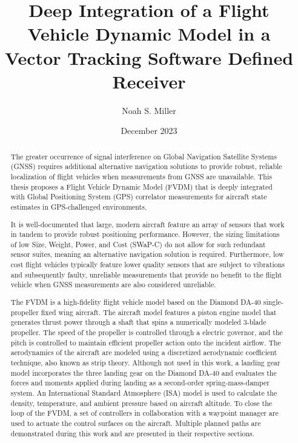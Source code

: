 \documentclass[12pt]{report}
\title{Deep Integration of a Flight Vehicle Dynamic Model in a Vector Tracking Software Defined Receiver}
\author{Noah S. Miller}
\date{December 2023}
\begin{document}
\begin{romanpages}      %

  \TitlePage{}
  \begin{abstract}
    The greater occurrence of signal interference on Global Navigation Satellite Systems (GNSS) requires additional alternative navigation solutions to provide robust, reliable localization of flight vehicles when measurements from GNSS are unavailable. This thesis proposes a Flight Vehicle Dynamic Model (FVDM) that is deeply integrated with Global Positioning System (GPS) correlator measurements for aircraft state estimates in GPS-challenged environments.

    It is well-documented that large, modern aircraft feature an array of sensors that work in tandem to provide robust positioning performance. However, the sizing limitations of low Size, Weight, Power, and Cost (SWaP-C) do not allow for such redundant sensor suites, meaning an alternative navigation solution is required. Furthermore, low cost flight vehicles typically feature lower quality sensors that are subject to vibrations and subsequently faulty, unreliable measurements that provide no benefit to the flight vehicle when GNSS measurements are also considered unreliable.

    The FVDM is a high-fidelity flight vehicle model based on the Diamond DA-40 single-propeller fixed wing aircraft. The aircraft model features a piston engine model that generates thrust power through a shaft that spins a numerically modeled 3-blade propeller. The speed of the propeller is controlled through a electric governor, and the pitch is controlled to maintain efficient propeller action onto the incident airflow. The aerodynamics of the aircraft are modeled using a discretized aerodynamic coefficient technique, also known as strip theory. Although not used in this work, a landing gear model incorporates the three landing gear on the Diamond DA-40 and evaluates the forces and moments applied during landing as a second-order spring-mass-damper system. An International Standard Atmosphere (ISA) model is used to calculate the density, temperature, and ambient pressure based on aircraft altitude. To close the loop of the FVDM, a set of controllers in collaboration with a waypoint manager are used to actuate the control surfaces on the aircraft. Multiple planned paths are demonstrated during this work and are presented in their respective sections.


\end{abstract}
\end{romanpages}
\end{document}
